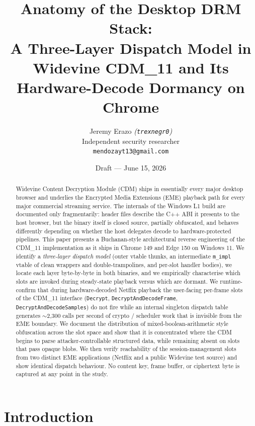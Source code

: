 \documentclass[11pt,letterpaper]{article}
\title{\textbf{Anatomy of the Desktop DRM Stack:\\
A Three-Layer Dispatch Model in Widevine CDM\_11 and Its
Hardware-Decode Dormancy on Chrome}}
\author{
  Jeremy Erazo \textit{(\texttt{trexnegr0})} \\
  Independent security researcher \\
  \texttt{mendozayt13@gmail.com}
}
\date{Draft --- June 15, 2026}
\begin{document}
\maketitle

\begin{abstract}
\noindent
Widevine Content Decryption Module (CDM) ships in essentially every
major desktop browser and underlies the Encrypted Media Extensions
(EME) playback path for every major commercial streaming service.
The internals of the Windows L1 build are documented only
fragmentarily: header files describe the C++ ABI it presents to the
host browser, but the binary itself is closed source, partially
obfuscated, and behaves differently depending on whether the host
delegates decode to hardware-protected pipelines.
This paper presents a Buchanan-style architectural reverse engineering
of the CDM\_11 implementation as it ships in Chrome 149 and Edge 150
on Windows 11.  We identify a \emph{three-layer dispatch model} (outer
vtable thunks, an intermediate \texttt{m\_impl} vtable of clean
wrappers and double-trampolines, and per-slot handler bodies), we
locate each layer byte-by-byte in both binaries, and we empirically
characterise which slots are invoked during steady-state playback
versus which are dormant.  We runtime-confirm that during
hardware-decoded Netflix playback the user-facing per-frame slots of
the CDM\_11 interface (\texttt{Decrypt},
\texttt{DecryptAndDecodeFrame}, \texttt{DecryptAndDecodeSamples}) do
not fire while an internal singleton dispatch table generates
$\sim$2{,}300 calls per second of crypto / scheduler work that is
invisible from the EME boundary.  We document the distribution of
mixed-boolean-arithmetic style obfuscation across the slot space and
show that it is concentrated where the CDM begins to parse
attacker-controllable structured data, while remaining absent on slots
that pass opaque blobs.  We then verify reachability of the
session-management slots from two distinct EME applications (Netflix
and a public Widevine test source) and show identical dispatch
behaviour.  No content key, frame buffer, or ciphertext byte is
captured at any point in the study.
\end{abstract}

\section{Introduction}
\label{sec:intro}
\end{document}
